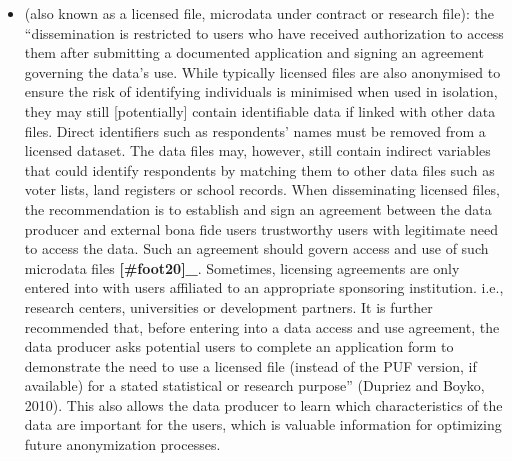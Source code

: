 \documentclass[letterpaper,10pt,english]{sphinxmanual}
\begin{document}
\begin{itemize}
\item {} 
 (also known as a licensed file,
microdata under contract or research file): the “dissemination is
restricted to users who have received authorization to access them
after submitting a documented application and signing an agreement
governing the data’s use. While typically licensed files are also
anonymised to ensure the risk of identifying individuals is minimised
when used in isolation, they may still {[}potentially{]} contain
identifiable data if linked with other data files. Direct identifiers
such as respondents’ names must be removed from a licensed dataset.
The data files may, however, still contain indirect variables that
could identify respondents by matching them to other data files such
as voter lists, land registers or school records. When disseminating
licensed files, the recommendation is to establish and sign an
agreement between the data producer and external bona fide users \textendash{}
trustworthy users with legitimate need to access the data. Such an
agreement should govern access and use of such microdata
files {\color{red}\bfseries{}{[}\#foot20{]}\_}. Sometimes, licensing agreements are only
entered into with users affiliated to an appropriate sponsoring
institution. i.e., research centers, universities or development
partners. It is further recommended that, before entering into a data
access and use agreement, the data producer asks potential users to
complete an application form to demonstrate the need to use a
licensed file (instead of the PUF version, if available) for a stated
statistical or research purpose” (Dupriez and Boyko, 2010). This also
allows the data producer to learn which characteristics of the data
are important for the users, which is valuable information for
optimizing future anonymization processes.


\end{itemize}
\end{document}

